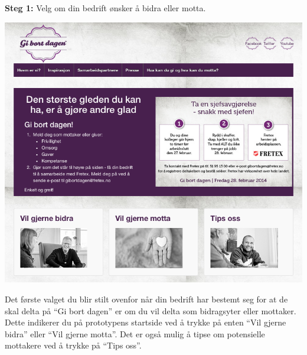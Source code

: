 {\bf Steg 1:} Velg om din bedrift ønsker å bidra eller motta.
\begin{center}
\includegraphics[clip=true, width=1 \textwidth,
trim=0cm 0cm 0cm 0cm]{startside.png}
\label{fig:startside}
\end{center}

Det første valget du blir stilt ovenfor når din bedrift har bestemt seg for at de skal delta på “Gi bort dagen” er om du vil delta som bidragsyter eller mottaker. Dette indikerer du på prototypens startside ved å trykke på enten ``Vil gjerne bidra'' eller ``Vil gjerne motta''. Det er også mulig å tipse om potensielle mottakere ved å trykke på ``Tips oss''.\\

\newpage

